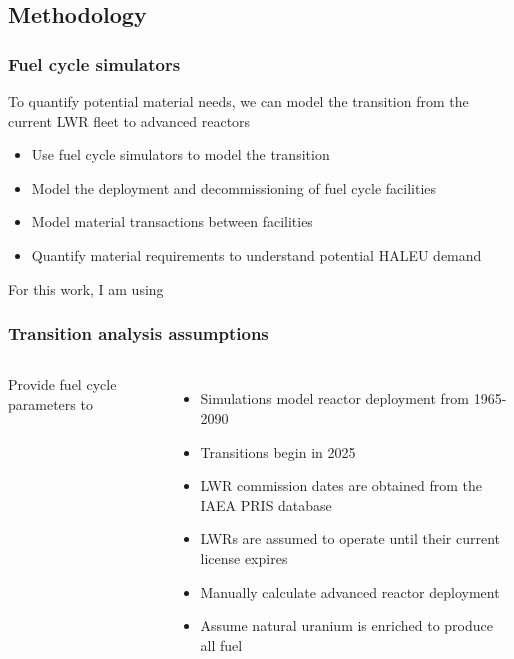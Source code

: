 \subsection{Methodology}
\begin{frame}
    \frametitle{Fuel cycle simulators}
    To quantify potential material needs, we can model the transition 
    from the current \gls{LWR} fleet to advanced reactors
    \begin{itemize}
        \item Use fuel cycle simulators to model the transition
        \item Model the deployment and decommissioning of fuel cycle facilities 
        \item Model material transactions between facilities
        \item Quantify material requirements to understand potential \gls{HALEU}
              demand
    \end{itemize}
    For this work, I am using \Cyclus \cite{huff_fundamental_2016}

\end{frame}

\begin{frame}
    \frametitle{Transition analysis assumptions}
    \begin{columns}
        
    \column[t]{6cm}
    \vspace{-0.9cm}
    

        \column[t]{4.5cm}
        Provide fuel cycle parameters to \Cyclus
        \begin{itemize}
            \item Simulations model reactor deployment from 1965-2090
            \item Transitions begin in 2025
            \item<2-> \gls{LWR} commission dates are obtained from the IAEA PRIS
                database \cite{noauthor_power_1989}
            \item<2-> \glspl{LWR} are assumed to operate until their current license 
                expires
            \item<3-> Manually calculate advanced reactor deployment
            \item<3-> Assume natural uranium is enriched to produce all 
                  fuel
        \end{itemize}

\end{columns}
\end{frame}

